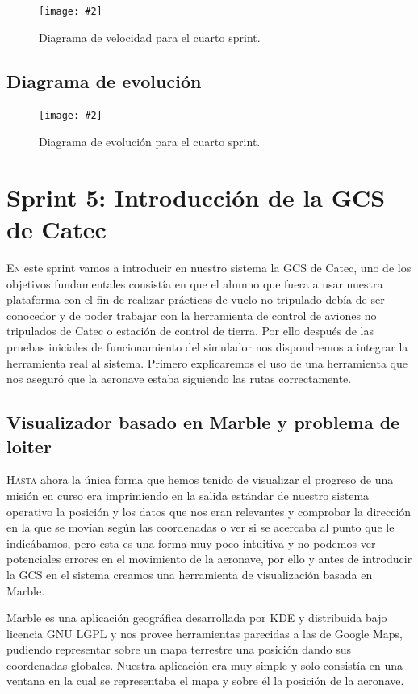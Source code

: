 \documentclass[12pt,a4paper,spanish]{book} %
\newcommand{\imgCentradaGrande}[3]{
\begin{figure}[H]
\begin{center}
\texttt{[image: \#2]}
\caption{#3}
\label{#1}
\end{center}
\end{figure}
}
\begin{document}
\imgCentradaGrande{fig.4.15}{img/diagvelocidad4.eps}{Diagrama de velocidad para el cuarto sprint.}

\subsection{Diagrama de evolución}
\imgCentradaGrande{fig.4.15}{img/diagevolucion4.eps}{Diagrama de evolución para el cuarto sprint.}

\newpage
\section{Sprint 5: Introducción de la GCS de Catec}

\lettrine{E}{n} este sprint vamos a introducir en nuestro sistema la GCS de Catec, uno de los objetivos fundamentales consistía en que el alumno que fuera a usar nuestra plataforma con el fin de realizar prácticas de vuelo no tripulado debía de ser conocedor y de poder trabajar con la herramienta de control de aviones no tripulados de Catec o estación de control de tierra. Por ello después de las pruebas iniciales de funcionamiento del simulador nos dispondremos a integrar la herramienta real al sistema. Primero explicaremos el uso de una herramienta que nos aseguró que la aeronave estaba siguiendo las rutas correctamente.

\subsection{Visualizador basado en Marble y problema de loiter}

\lettrine{H}{asta} ahora la única forma que hemos tenido de visualizar el progreso de una misión en curso era imprimiendo en la salida estándar de nuestro sistema operativo la posición y los datos que nos eran relevantes y comprobar la dirección en la que se movían según las coordenadas o ver si se acercaba al punto que le indicábamos, pero esta es una forma muy poco intuitiva y no podemos ver potenciales errores en el movimiento de la aeronave, por ello y antes de introducir la GCS en el sistema creamos una herramienta de visualización basada en Marble.

Marble es una aplicación geográfica desarrollada por KDE y distribuida bajo licencia GNU LGPL y nos provee herramientas parecidas a las de Google Maps, pudiendo representar sobre un mapa terrestre una posición dando sus coordenadas globales. Nuestra aplicación era muy simple y solo consistía en una ventana en la cual se representaba el mapa y sobre él la posición de la aeronave. 
\end{document}
